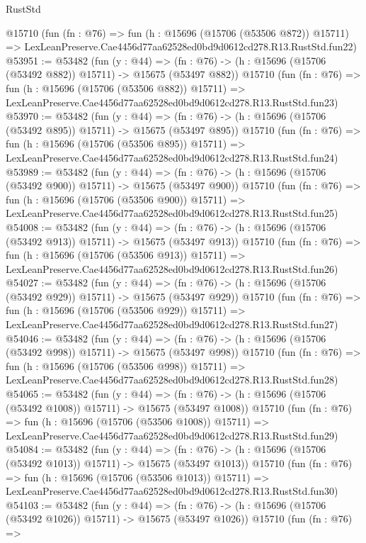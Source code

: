 \begin{lexlean}{RustStd}
\begin{coremodule}
    @15710
    (fun (fn : @76) =>
    fun (h : @15696 (@15706 (@53506 @872)) @15711) =>
    LexLeanPreserve.Cae4456d77aa62528ed0bd9d0612cd278.R13.RustStd.fun22)
@53951 := @53482
    (fun (y : @44) =>
    (fn : @76) -> (h : @15696 (@15706 (@53492 @882)) @15711) -> @15675 (@53497 @882))
    @15710
    (fun (fn : @76) =>
    fun (h : @15696 (@15706 (@53506 @882)) @15711) =>
    LexLeanPreserve.Cae4456d77aa62528ed0bd9d0612cd278.R13.RustStd.fun23)
@53970 := @53482
    (fun (y : @44) =>
    (fn : @76) -> (h : @15696 (@15706 (@53492 @895)) @15711) -> @15675 (@53497 @895))
    @15710
    (fun (fn : @76) =>
    fun (h : @15696 (@15706 (@53506 @895)) @15711) =>
    LexLeanPreserve.Cae4456d77aa62528ed0bd9d0612cd278.R13.RustStd.fun24)
@53989 := @53482
    (fun (y : @44) =>
    (fn : @76) -> (h : @15696 (@15706 (@53492 @900)) @15711) -> @15675 (@53497 @900))
    @15710
    (fun (fn : @76) =>
    fun (h : @15696 (@15706 (@53506 @900)) @15711) =>
    LexLeanPreserve.Cae4456d77aa62528ed0bd9d0612cd278.R13.RustStd.fun25)
@54008 := @53482
    (fun (y : @44) =>
    (fn : @76) -> (h : @15696 (@15706 (@53492 @913)) @15711) -> @15675 (@53497 @913))
    @15710
    (fun (fn : @76) =>
    fun (h : @15696 (@15706 (@53506 @913)) @15711) =>
    LexLeanPreserve.Cae4456d77aa62528ed0bd9d0612cd278.R13.RustStd.fun26)
@54027 := @53482
    (fun (y : @44) =>
    (fn : @76) -> (h : @15696 (@15706 (@53492 @929)) @15711) -> @15675 (@53497 @929))
    @15710
    (fun (fn : @76) =>
    fun (h : @15696 (@15706 (@53506 @929)) @15711) =>
    LexLeanPreserve.Cae4456d77aa62528ed0bd9d0612cd278.R13.RustStd.fun27)
@54046 := @53482
    (fun (y : @44) =>
    (fn : @76) -> (h : @15696 (@15706 (@53492 @998)) @15711) -> @15675 (@53497 @998))
    @15710
    (fun (fn : @76) =>
    fun (h : @15696 (@15706 (@53506 @998)) @15711) =>
    LexLeanPreserve.Cae4456d77aa62528ed0bd9d0612cd278.R13.RustStd.fun28)
@54065 := @53482
    (fun (y : @44) =>
    (fn : @76) -> (h : @15696 (@15706 (@53492 @1008)) @15711) -> @15675 (@53497 @1008))
    @15710
    (fun (fn : @76) =>
    fun (h : @15696 (@15706 (@53506 @1008)) @15711) =>
    LexLeanPreserve.Cae4456d77aa62528ed0bd9d0612cd278.R13.RustStd.fun29)
@54084 := @53482
    (fun (y : @44) =>
    (fn : @76) -> (h : @15696 (@15706 (@53492 @1013)) @15711) -> @15675 (@53497 @1013))
    @15710
    (fun (fn : @76) =>
    fun (h : @15696 (@15706 (@53506 @1013)) @15711) =>
    LexLeanPreserve.Cae4456d77aa62528ed0bd9d0612cd278.R13.RustStd.fun30)
@54103 := @53482
    (fun (y : @44) =>
    (fn : @76) -> (h : @15696 (@15706 (@53492 @1026)) @15711) -> @15675 (@53497 @1026))
    @15710
    (fun (fn : @76) =>

\end{coremodule}
\end{lexlean}

